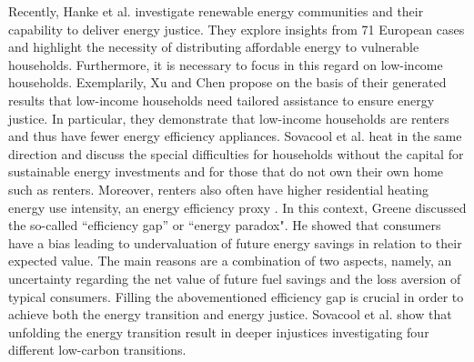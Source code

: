 Recently, Hanke et al. \cite{hanke2021renewable} investigate renewable energy communities and their capability to deliver energy justice. They explore insights from 71 European cases and highlight the necessity of distributing affordable energy to vulnerable households. Furthermore, it is necessary to focus in this regard on low-income households. Exemplarily, Xu and Chen \cite{xu2019energy} propose on the basis of their generated results that low-income households need tailored assistance to ensure energy justice. In particular, they demonstrate that low-income households are renters and thus have fewer energy efficiency appliances. Sovacool et al. \cite{sovacool2019temporality} heat in the same direction and discuss the special difficulties for households without the capital for sustainable energy investments and for those that do not own their own home such as renters. Moreover, renters also often have higher residential heating energy use intensity, an energy efficiency proxy \cite{reames2016targeting}. In this context, Greene \cite{greene2011uncertainty} discussed the so-called “efficiency gap” or “energy paradox". He showed that consumers have a bias leading to undervaluation of future energy savings in relation to their expected value. The main reasons are a combination of two aspects, namely, an uncertainty regarding the net value of future fuel savings and the loss aversion of typical consumers. Filling the abovementioned efficiency gap is crucial in order to achieve both the energy transition and energy justice. Sovacool et al. \cite{sovacool2019decarbonization} show that unfolding the energy transition result in deeper injustices investigating four different low-carbon transitions.

